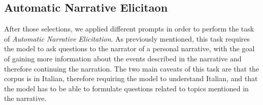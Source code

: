 
\subsection{Automatic Narrative Elicitaon}
\label{cha:methodology-personal-narrative-elicitation}
After those selections, we applied different prompts in order to perform the task of  \emph{Automatic Narrative Elicitation}.  As previously mentioned, this task requires the model to ask questions to the narrator of a personal narrative, with the goal of gaining more information about the events described in the narrative and therefore continuing the narration. The two main caveats of this task are that the corpus is in Italian, therefore requiring the model to understand Italian, and that the model has to be able to formulate questions related to topics mentioned in the narrative. 

